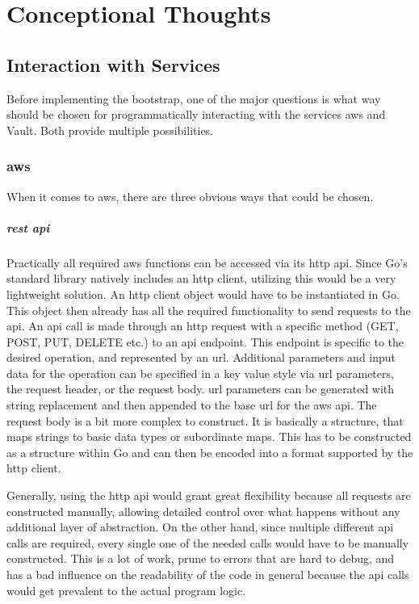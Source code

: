 \chapter{Conceptional Thoughts}
\label{sec:concept}

\section{Interaction with Services}
Before implementing the bootstrap, one of the major questions is what way should be chosen for programmatically interacting with the services \ac{aws} and Vault.
Both provide multiple possibilities.

\subsection{\ac{aws}}
When it comes to \ac{aws}, there are three obvious ways that could be chosen.

\paragraph{\acs{rest} \ac{api}}
Practically all required \ac{aws} functions can be accessed via its \ac{http} \ac{api}.
Since Go's standard library natively includes an \ac{http} client, utilizing this would be a very lightweight solution.
An \ac{http} client object would have to be instantiated in Go.
This object then already has all the required functionality to send requests to the \ac{api}.
An \ac{api} call is made through an \ac{http} request with a specific method (GET, POST, PUT, DELETE etc.) to an \ac{api} endpoint.
This endpoint is specific to the desired operation, and represented by an \ac{url}.
Additional parameters and input data for the operation can be specified in a key value style via \ac{url} parameters, the request header, or the request body.
\ac{url} parameters can be generated with string replacement and then appended to the base \ac{url} for the \ac{aws} \ac{api}.
The request body is a bit more complex to construct.
It is basically a structure, that maps strings to basic data types or subordinate maps.
This has to be constructed as a structure within Go and can then be encoded into a format supported by the \ac{http} client.

Generally, using the \ac{http} \ac{api} would grant great flexibility because all requests are constructed manually, allowing detailed control over what happens without any additional layer of abstraction.
On the other hand, since multiple different \ac{api} calls are required, every single one of the needed calls would have to be manually constructed.
This is a lot of work, prune to errors that are hard to debug, and has a bad influence on the readability of the code in general because the \ac{api} calls would get prevalent to the actual program logic.

